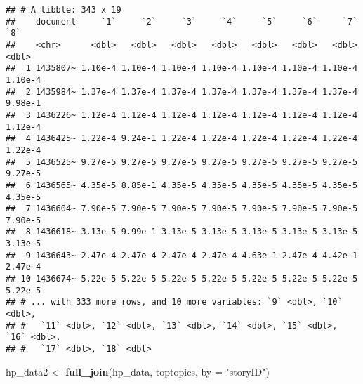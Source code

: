 \documentclass[
]{article}
\newenvironment{Shaded}{\begin{snugshade}}{\end{snugshade}}
\newcommand{\DataTypeTok}[1]{\textcolor[rgb]{0.13,0.29,0.53}{#1}}
\newcommand{\DecValTok}[1]{\textcolor[rgb]{0.00,0.00,0.81}{#1}}
\newcommand{\KeywordTok}[1]{\textcolor[rgb]{0.13,0.29,0.53}{\textbf{#1}}}
\newcommand{\NormalTok}[1]{#1}
\newcommand{\OperatorTok}[1]{\textcolor[rgb]{0.81,0.36,0.00}{\textbf{#1}}}
\newcommand{\StringTok}[1]{\textcolor[rgb]{0.31,0.60,0.02}{#1}}
\begin{document}
\begin{verbatim}
## # A tibble: 343 x 19
##    document     `1`     `2`     `3`     `4`     `5`     `6`     `7`     `8`
##    <chr>      <dbl>   <dbl>   <dbl>   <dbl>   <dbl>   <dbl>   <dbl>   <dbl>
##  1 1435807~ 1.10e-4 1.10e-4 1.10e-4 1.10e-4 1.10e-4 1.10e-4 1.10e-4 1.10e-4
##  2 1435984~ 1.37e-4 1.37e-4 1.37e-4 1.37e-4 1.37e-4 1.37e-4 1.37e-4 9.98e-1
##  3 1436226~ 1.12e-4 1.12e-4 1.12e-4 1.12e-4 1.12e-4 1.12e-4 1.12e-4 1.12e-4
##  4 1436425~ 1.22e-4 9.24e-1 1.22e-4 1.22e-4 1.22e-4 1.22e-4 1.22e-4 1.22e-4
##  5 1436525~ 9.27e-5 9.27e-5 9.27e-5 9.27e-5 9.27e-5 9.27e-5 9.27e-5 9.27e-5
##  6 1436565~ 4.35e-5 8.85e-1 4.35e-5 4.35e-5 4.35e-5 4.35e-5 4.35e-5 4.35e-5
##  7 1436604~ 7.90e-5 7.90e-5 7.90e-5 7.90e-5 7.90e-5 7.90e-5 7.90e-5 7.90e-5
##  8 1436618~ 3.13e-5 9.99e-1 3.13e-5 3.13e-5 3.13e-5 3.13e-5 3.13e-5 3.13e-5
##  9 1436643~ 2.47e-4 2.47e-4 2.47e-4 2.47e-4 4.63e-1 2.47e-4 4.42e-1 2.47e-4
## 10 1436674~ 5.22e-5 5.22e-5 5.22e-5 5.22e-5 5.22e-5 5.22e-5 5.22e-5 5.22e-5
## # ... with 333 more rows, and 10 more variables: `9` <dbl>, `10` <dbl>,
## #   `11` <dbl>, `12` <dbl>, `13` <dbl>, `14` <dbl>, `15` <dbl>, `16` <dbl>,
## #   `17` <dbl>, `18` <dbl>
\end{verbatim}

\begin{Shaded}
\end{Shaded}

\begin{Shaded}
\begin{Highlighting}[]
\NormalTok{hp_data2 <-}\StringTok{ }\KeywordTok{full_join}\NormalTok{(hp_data, toptopics, }\DataTypeTok{by =} \StringTok{"storyID"}\NormalTok{)}
\end{Highlighting}
\end{Shaded}

\begin{Shaded}
\end{Shaded}
\end{document}
